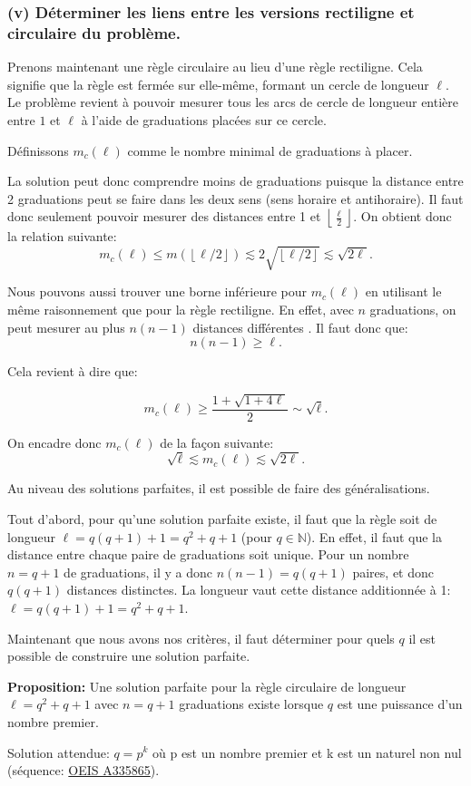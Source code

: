 \subsubsection*{(v) Déterminer les liens entre les versions rectiligne et circulaire du problème.}

Prenons maintenant une règle circulaire au lieu d'une règle rectiligne. Cela signifie que la règle est fermée sur elle-même, formant un cercle de longueur $\ell$. Le problème revient à pouvoir mesurer tous les arcs de cercle de longueur entière entre $1$ et $\ell$ à l'aide de graduations placées sur ce cercle. 

Définissons $m_{c}(\ell)$ comme le nombre minimal de graduations à placer.

La solution peut donc comprendre moins de graduations puisque la distance entre 2 graduations peut se faire dans les deux sens (sens horaire et antihoraire). Il faut donc seulement pouvoir mesurer des distances entre 1 et $\left\lfloor \frac{\ell}{2} \right\rfloor$. On obtient donc la relation suivante:
\[
m_{c}(\ell) \leq m( \left\lfloor \ell/2 \right\rfloor ) \lesssim 2\sqrt{ \left\lfloor \ell/2 \right\rfloor } \lesssim \sqrt{2\ell}.
\]

Nous pouvons aussi trouver une borne inférieure pour $m_{c}(\ell)$ en utilisant le même raisonnement que pour la règle rectiligne. En effet, avec $n$ graduations, on peut mesurer au plus $n(n-1)$ distances différentes . Il faut donc que:
\[n(n-1) \geq \ell .\]

Cela revient à dire que:

\[
m_{c}(\ell) \geq \frac{1 + \sqrt{1 + 4\ell}}{2} \sim \sqrt{\ell}.
\]

On encadre donc $m_{c}(\ell)$ de la façon suivante:
\[
\sqrt{\ell} \lesssim m_{c}(\ell) \lesssim \sqrt{2\ell}.
\]


Au niveau des solutions parfaites, il est possible de faire des généralisations.

\medskip

Tout d'abord, pour qu'une solution parfaite existe, il faut que la règle soit de longueur $\ell = q(q+1) + 1 = q^2 + q + 1$ (pour $q \in \mathbb{N}$). En effet, il faut que la distance entre chaque paire de graduations soit unique. Pour un nombre $n = q+1$ de graduations, il y a donc $n(n-1) = q(q+1)$ paires, et donc $q(q+1)$ distances distinctes. La longueur vaut cette distance additionnée à 1: $\ell = q(q+1) + 1 = q^2 + q + 1$.

\medskip

Maintenant que nous avons nos critères, il faut déterminer pour quels $q$ il est possible de construire une solution parfaite.

\vspace{1\baselineskip}

\textbf{Proposition:} Une solution parfaite pour la règle circulaire de longueur $\ell = q^2 + q + 1$ avec $n = q + 1$ graduations existe lorsque $q$ est une puissance d'un nombre premier.

\vspace{2\baselineskip}

Solution attendue: $q = p^k$ où p est un nombre premier et k est un naturel non nul (séquence: \href{https://oeis.org/A335865}{OEIS A335865}).